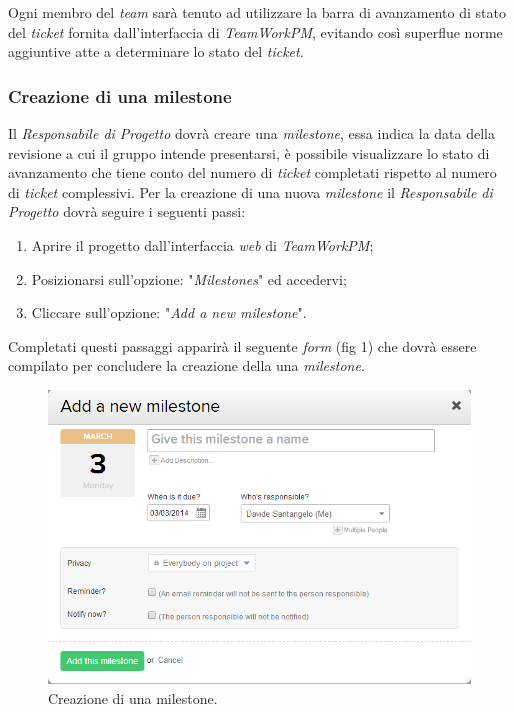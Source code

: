 Ogni membro del \textit{team} sarà tenuto ad utilizzare la barra di avanzamento di stato del \textit{ticket} fornita dall'interfaccia di \textit{TeamWorkPM}, evitando così superflue norme aggiuntive atte a determinare lo stato del \textit{ticket}.

\subsubsection{Creazione di una milestone}
Il \textit{Responsabile di Progetto} dovrà creare una \textit{milestone}, essa indica la data della revisione a cui il gruppo \gruppo{} intende presentarsi, è possibile visualizzare lo stato di avanzamento che tiene conto del numero di \textit{ticket} completati rispetto al numero di \textit{ticket} complessivi.
Per la creazione di una nuova \textit{milestone} il \textit{Responsabile di Progetto} dovrà seguire i seguenti passi:
\begin{enumerate}
\item Aprire il progetto dall'interfaccia \textit{web} di \textit{TeamWorkPM};
\item Posizionarsi sull'opzione: "\emph{Milestones}" ed accedervi;
\item Cliccare sull'opzione: "\emph{Add a new milestone}".
\end{enumerate}

Completati questi passaggi apparirà il seguente \textit{form} (fig 1) che dovrà essere compilato per concludere la creazione della una \textit{milestone}.
\begin{figure}
\centering
\includegraphics[width=%
\textwidth]{immaginiNDP/Immagine}
\caption[]{Creazione di una milestone.}
\label{fig:Immagine}
\end{figure}

